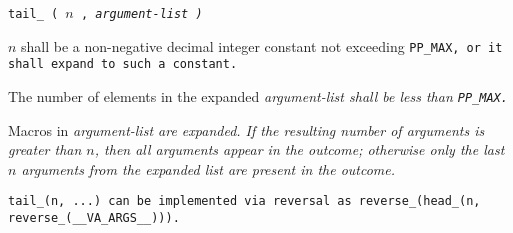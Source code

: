 
\tt{tail_ (} $n$ \tt{,} \it{argument-list} \tt{)}


$n$ shall be a non-negative decimal integer constant not exceeding \tt{PP_MAX},
or it shall expand to such a constant.

The number of elements in the expanded
\it{argument-list} shall be less than \tt{PP_MAX}.


Macros in \it{argument-list} are expanded.
If the resulting number of arguments is greater than $n$,
then all arguments appear in the outcome; otherwise only the last
$n$ arguments from the expanded list are present in the outcome.

\note \tt{tail_(n, ...)} can be implemented via reversal as
\tt{reverse_(head_(n, reverse_(__VA_ARGS__)))}.
